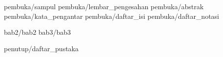 \documentclass[a5paper, twoside, 11pt, listof=nochaptergap, bahasa] {book}
\begin{document}
\begin{sloppypar}
	
	\pagestyle {normal}
	
	\frontmatter
		 {pembuka/sampul}
		 {pembuka/lembar_pengesahan}
		 {pembuka/abstrak}
		 {pembuka/kata_pengantar}
		 {pembuka/daftar_isi}
		 {pembuka/daftar_notasi}
	
	\mainmatter
		 {bab2/bab2} \cleardoublepage
		 {bab3/bab3} \cleardoublepage
	
	\backmatter
	 	 {penutup/daftar_pustaka}
		
\end{sloppypar}
\end{document}

